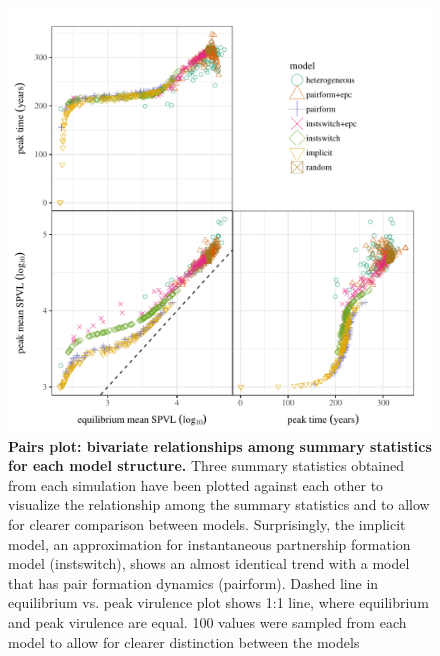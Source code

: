 \documentclass[10pt,letterpaper]{article}
\begin{document}
\begin{figure}[!ht]
\includegraphics[width=\textwidth]{../figures/fig4.pdf}
\caption{{\bf Pairs plot: bivariate relationships among summary statistics for each model structure.}
Three summary statistics obtained from each simulation have been plotted against each other to visualize the relationship among the summary statistics and to allow for clearer comparison between models.
Surprisingly, the implicit model, an approximation for instantaneous partnership formation model (instswitch), shows an almost identical trend with a model that has pair formation dynamics (pairform).
Dashed line in equilibrium vs. peak virulence plot shows 1:1 line, where equilibrium and peak virulence are equal.
100 values were sampled from each model to allow for clearer distinction between the models}
\label{fig:pairplot}
\end{figure}
\end{document}
